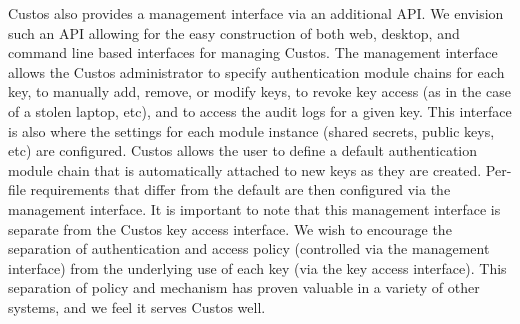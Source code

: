 Custos also provides a management interface via an additional API. We
envision such an API allowing for the easy construction of both web,
desktop, and command line based interfaces for managing Custos. The
management interface allows the Custos administrator to specify
authentication module chains for each key, to manually add, remove, or
modify keys, to revoke key access (as in the case of a stolen laptop,
etc), and to access the audit logs for a given key. This interface is
also where the settings for each module instance (shared secrets,
public keys, etc) are configured. Custos allows the user to define a
default authentication module chain that is automatically attached to
new keys as they are created. Per-file requirements that differ from
the default are then configured via the management interface. It is
important to note that this management interface is separate from the
Custos key access interface. We wish to encourage the separation of
authentication and access policy (controlled via the management
interface) from the underlying use of each key (via the key access
interface). This separation of policy and mechanism has proven
valuable in a variety of other systems, and we feel it serves Custos
well.
